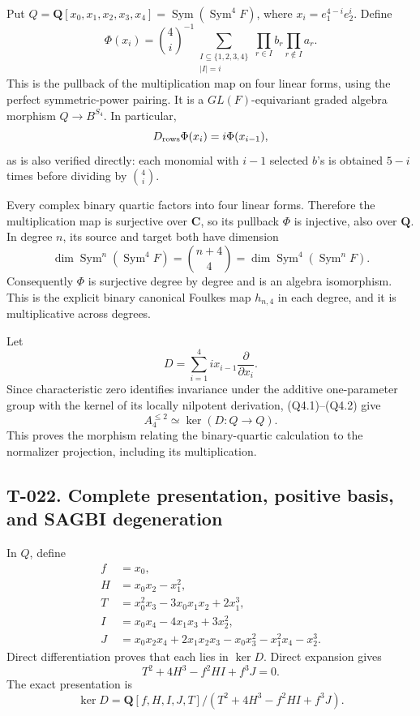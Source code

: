 \documentclass[
  10pt,
]{article}
\begin{document}
Put
\(Q=\mathbf Q[x_0,x_1,x_2,x_3,x_4]=\operatorname{Sym}(\operatorname{Sym}^4F)\),
where \(x_i=e_1^{4-i}e_2^i\). Define \[
\Phi(x_i)=\binom4i^{-1}
\sum_{\substack{I\subseteq\{1,2,3,4\}\\|I|=i}}
\prod_{r\in I}b_r\prod_{r\notin I}a_r.
\tag{Q4.2}
\] This is the pullback of the multiplication map on four linear forms,
using the perfect symmetric-power pairing. It is a \(GL(F)\)-equivariant
graded algebra morphism \(Q\to B^{S_4}\). In particular, \[
D_{\rm rows}\Phi(x_i)=i\Phi(x_{i-1}),
\] as is also verified directly: each monomial with \(i-1\) selected
\(b\)'s is obtained \(5-i\) times before dividing by \(\binom4i\).

Every complex binary quartic factors into four linear forms. Therefore
the multiplication map is surjective over \(\mathbf C\), so its pullback
\(\Phi\) is injective, also over \(\mathbf Q\). In degree \(n\), its
source and target both have dimension \[
\dim\operatorname{Sym}^n(\operatorname{Sym}^4F)
=\binom{n+4}{4}
=\dim\operatorname{Sym}^4(\operatorname{Sym}^nF).
\] Consequently \(\Phi\) is surjective degree by degree and is an
algebra isomorphism. This is the explicit binary canonical Foulkes map
\(h_{n,4}\) in each degree, and it is multiplicative across degrees.

Let \[
D=\sum_{i=1}^4 i x_{i-1}\frac{\partial}{\partial x_i}.
\] Since characteristic zero identifies invariance under the additive
one-parameter group with the kernel of its locally nilpotent derivation,
(Q4.1)--(Q4.2) give \[
\boxed{A_4^{\le2}\simeq\ker(D:Q\to Q).}
\tag{Q4.3}
\] This proves the morphism relating the binary-quartic calculation to
the normalizer projection, including its multiplication.

\subsection{T-022. Complete presentation, positive basis, and SAGBI
degeneration}\label{t-022.-complete-presentation-positive-basis-and-sagbi-degeneration}

In \(Q\), define \[
\begin{aligned}
f&=x_0,\\
H&=x_0x_2-x_1^2,\\
T&=x_0^2x_3-3x_0x_1x_2+2x_1^3,\\
I&=x_0x_4-4x_1x_3+3x_2^2,\\
J&=x_0x_2x_4+2x_1x_2x_3-x_0x_3^2-x_1^2x_4-x_2^3.
\end{aligned}
\tag{Q4.4}
\] Direct differentiation proves that each lies in \(\ker D\). Direct
expansion gives \[
T^2+4H^3-f^2HI+f^3J=0.
\tag{Q4.5}
\] The exact presentation is \[
\boxed{\ker D=\mathbf Q[f,H,I,J,T]/(T^2+4H^3-f^2HI+f^3J).}
\tag{Q4.6}
\]
\end{document}
